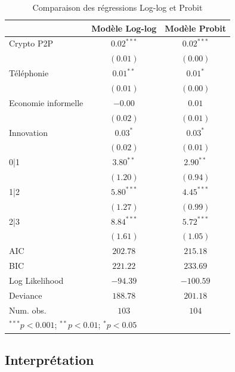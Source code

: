 \documentclass[12pt]{article}
\begin{document}
\FloatBarrier

\begin{table}[htbp]
\centering
\begin{tabular}{l c c}
\hline
 & Modèle Log-log & Modèle Probit \\
\hline
Crypto P2P            & $0.02^{***}$ & $0.02^{***}$ \\
               & $(0.01)$     & $(0.00)$     \\
Téléphonie         & $0.01^{**}$  & $0.01^{*}$   \\
               & $(0.01)$     & $(0.00)$     \\
Economie informelle       & $-0.00$      & $0.01$       \\
               & $(0.02)$     & $(0.01)$     \\
Innovation     & $0.03^{*}$   & $0.03^{*}$   \\
               & $(0.02)$     & $(0.01)$     \\
0|1     & $3.80^{**}$  & $2.90^{**}$  \\
               & $(1.20)$     & $(0.94)$     \\
1|2     & $5.80^{***}$ & $4.45^{***}$ \\
               & $(1.27)$     & $(0.99)$     \\
2|3     & $8.84^{***}$ & $5.72^{***}$ \\
               & $(1.61)$     & $(1.05)$     \\
\hline
AIC            & $202.78$     & $215.18$     \\
BIC            & $221.22$     & $233.69$     \\
Log Likelihood & $-94.39$     & $-100.59$    \\
Deviance       & $188.78$     & $201.18$     \\
Num. obs.      & $103$        & $104$        \\
\hline
\multicolumn{3}{l}{\scriptsize{$^{***}p<0.001$; $^{**}p<0.01$; $^{*}p<0.05$}}
\end{tabular}
\caption{Comparaison des régressions Log-log et Probit}
\label{tab:comparison_regressions}
\end{table}

\subsection{Interprétation}
\end{document}
